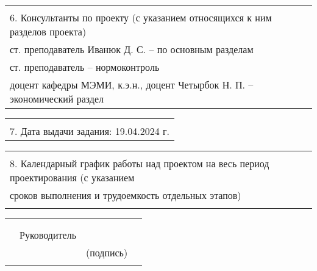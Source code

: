 \documentclass[12pt, А4, twoside]{article}
\begin{document}
\begin{FlushLeft}
    \begin{tabular}{p{17.25cm}} 
        \vspace{1pt} \hline  \\
        \textsf{6. Консультанты по проекту (с указанием относящихся к ним разделов проекта)} \vspace{1pt} \hline \\
        \hspace{0.3cm} \textsf{ст. преподаватель Иванюк Д. С. {--} по основным разделам} \vspace{1pt} \hline \\
        \hspace{0.3cm} \textsf{ст. преподаватель {--} нормоконтроль} \vspace{1pt} \hline \\
        \hspace{0.3cm} \textsf{доцент кафедры МЭМИ, к.э.н., доцент Четырбок Н. П. {--} экономический раздел} \vspace{1pt} \hline \\
    \end{tabular}   

    \begin{tabular}{p{17.25cm}} 
        \vspace{1pt} \hline \\
        \textsf{7. Дата выдачи задания: 19.04.2024 г.} \vspace{1pt} \hline \\
    \end{tabular} 

    \begin{tabular}{p{17.25cm}} 
        \vspace{1pt} \hline \\
        \textsf{8. Календарный график работы над проектом на весь период проектирования (с указанием} \vspace{1pt} \hline \\
        \textsf{сроков выполнения и трудоемкость отдельных этапов)} \vspace{1pt} \hline \\
        \vspace{1pt} \hline \\
    \end{tabular} 

    \begin{tabular}{p{4.2cm} p{3.8cm} p{6.0cm} p{2.0cm}} 
        & & & 
        \\ 
        & & & 
        \\
        & \fontsize{14}{17.5} \textrm{Руководитель} & 
        \vspace{1pt} \hline & 
        \\ 
        & & \centering \fontsize{12}{15} \textsf{(подпись)} & 
        \\ 
        & & &
    \end{tabular} 


\end{FlushLeft}
\end{document}
